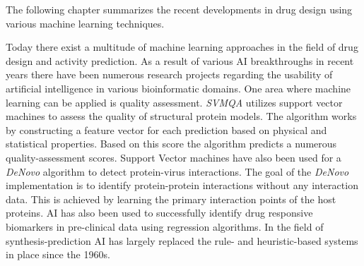 The following chapter summarizes the recent developments in drug design using various machine 
learning techniques. 

Today there exist a multitude of machine learning approaches in the field of drug design and activity prediction.
As a result of various AI breakthroughs in recent years there have been numerous research projects regarding the usability of artificial intelligence
in various bioinformatic domains.
One area where machine learning can be applied is quality assessment.
\textit{SVMQA} utilizes support vector machines to assess the quality of structural protein models.
The algorithm works by constructing a feature vector for each prediction based on physical and statistical properties.
Based on this score the algorithm predicts a numerous quality-assessment scores\cite{Manavalan2017}.
Support Vector machines have also been used for a \textit{DeNovo} algorithm to detect protein-virus interactions.
The goal of the \textit{DeNovo} implementation is to identify protein-protein interactions without any interaction data.
This is achieved by learning the primary interaction points of the host proteins\cite{Eid2016}.
AI has also been used to successfully identify drug responsive biomarkers in pre-clinical data using regression algorithms\cite{Li2015}.
In the field of synthesis-prediction AI has largely replaced the rule- and heuristic-based systems in place since the 1960s\cite{Johansson2019}.

